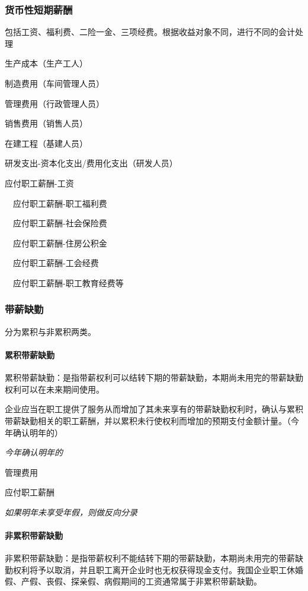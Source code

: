 \documentclass[UTF8,12pt]{ctexart}
\newenvironment{Dr}{%
	\begin{list}{}%
		{
			\setlength{\leftmargin}{2em}
			\setlength{\labelwidth}{2em}
			\setlength{\labelsep}{0pt}
			\setlength{\itemindent}{0pt}
			\setlength{\listparindent}{0pt}
			\setlength{\parsep}{0pt}
			\setlength{\topsep}{0pt}
		}
		\item[\textbf{借：}]
	}{%
	\end{list}
}
\newenvironment{Cr}{%
	\begin{list}{}%
		{
			\setlength{\leftmargin}{2em}
			\setlength{\labelwidth}{2em}
			\setlength{\labelsep}{0pt}
			\setlength{\itemindent}{0pt}
			\setlength{\listparindent}{0pt}
			\setlength{\parsep}{0pt}
			\setlength{\topsep}{0pt}
		}
		\item[\textbf{贷：}]
	}{%
	\end{list}
}
\numberwithin{equation}{section} %
\numberwithin{figure}{section}
\numberwithin{table}{section}
\begin{document}
	\subsubsection{货币性短期薪酬}
	包括工资、福利费、二险一金、三项经费。根据收益对象不同，进行不同的会计处理
	
	\begin{Dr}
		生产成本（生产工人）
		
		制造费用（车间管理人员）
		
		管理费用（行政管理人员）
		
		销售费用（销售人员）
		
		在建工程（基建人员）
		
		研发支出-资本化支出/费用化支出（研发人员）
	\end{Dr}
	\begin{Cr}
		应付职工薪酬-工资
		
		\ \ 应付职工薪酬-职工福利费
		
		\ \ 应付职工薪酬-社会保险费
		
		\ \ 应付职工薪酬-住房公积金
		
		\ \ 应付职工薪酬-工会经费
		
		\ \ 应付职工薪酬-职工教育经费等
	\end{Cr}

	\subsubsection{带薪缺勤}
	
	分为累积与非累积两类。
	
	\paragraph{累积带薪缺勤}累积带薪缺勤：是指带薪权利可以结转下期的带薪缺勤，本期尚未用完的带薪缺勤权利可以在未来期间使用。
	
	企业应当在职工提供了服务从而增加了其未来享有的带薪缺勤权利时，确认与累积带薪缺勤相关的职工薪酬，并以累积未行使权利而增加的预期支付金额计量。（今年确认明年的）
	
	\textit{今年确认明年的}
	
	\begin{Dr}
		管理费用
	\end{Dr}
	\begin{Cr}
		应付职工薪酬
	\end{Cr}

	\textit{如果明年未享受年假，则做反向分录}
	
	\paragraph{非累积带薪缺勤}非累积带薪缺勤：是指带薪权利不能结转下期的带薪缺勤，本期尚未用完的带薪缺勤权利将予以取消，并且职工离开企业时也无权获得现金支付。我国企业职工休婚假、产假、丧假、探亲假、病假期间的工资通常属于非累积带薪缺勤。
	
\end{document}
